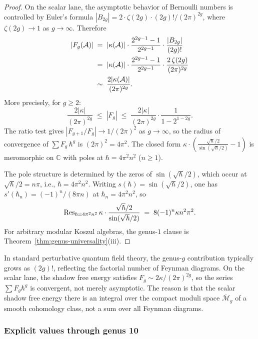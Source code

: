 \begin{proof}
On the scalar lane, the asymptotic behavior of
Bernoulli numbers is controlled by Euler's formula
$|B_{2g}| = 2 \cdot \zeta(2g) \cdot (2g)! / (2\pi)^{2g}$, where
$\zeta(2g) \to 1$ as $g \to \infty$. Therefore
\begin{align}
|F_g(\mathcal{A})| &\;=\; |\kappa(\mathcal{A})| \cdot \frac{2^{2g-1}-1}{2^{2g-1}} \cdot \frac{|B_{2g}|}{(2g)!} \notag \\
&\;=\; |\kappa(\mathcal{A})| \cdot \frac{2^{2g-1}-1}{2^{2g-1}} \cdot \frac{2\,\zeta(2g)}{(2\pi)^{2g}} \notag \\
&\;\sim\; \frac{2|\kappa(\mathcal{A})|}{(2\pi)^{2g}}. \label{eq:thqg-I-Fg-asymptotics}
\end{align}
More precisely, for $g \geq 2$:
\[
\frac{2|\kappa|}{(2\pi)^{2g}} \;\leq\; |F_g| \;\leq\; \frac{2|\kappa|}{(2\pi)^{2g}} \cdot \frac{1}{1 - 2^{1-2g}}.
\]
The ratio test gives $|F_{g+1}/F_g| \to 1/(2\pi)^2$ as $g \to \infty$, so the radius of convergence of $\sum F_g\,\hbar^g$ is $(2\pi)^2 = 4\pi^2$. The closed form $\kappa \cdot (\frac{\sqrt{\hbar}/2}{\sin(\sqrt{\hbar}/2)} - 1)$ is meromorphic on $\mathbb{C}$ with poles at $\hbar = 4\pi^2 n^2$ ($n \geq 1$).

The pole structure is determined by the zeros of $\sin(\sqrt{\hbar}/2)$,
which occur at $\sqrt{\hbar}/2 = n\pi$, i.e.,
$\hbar = 4\pi^2 n^2$. Writing $s(\hbar)=\sin(\sqrt{\hbar}/2)$, one
has $s'(\hbar_n)=(-1)^n/(8\pi n)$ at $\hbar_n = 4\pi^2 n^2$, so
\[
\operatorname{Res}_{\hbar = 4\pi^2 n^2}
\kappa \cdot \frac{\sqrt{\hbar}/2}{\sin(\sqrt{\hbar}/2)}
\;=\; 8(-1)^n \kappa n^2\pi^2.
\]
For arbitrary modular Koszul algebras, the genus-$1$ clause is
Theorem~\ref{thm:genus-universality}\textup{(iii)}.
\end{proof}

\begin{remark}
\label{rem:thqg-I-factorial-convergent}
In standard perturbative quantum field theory, the genus-$g$
contribution typically grows as $(2g)!$, reflecting the factorial
number of Feynman diagrams. On the scalar lane, the
shadow free energy satisfies $F_g \sim 2\kappa/(2\pi)^{2g}$, so the
series $\sum F_g \hbar^g$ is convergent, not merely asymptotic. The
reason is that the scalar shadow free energy there is an integral over
the compact moduli space $\overline{\mathcal{M}}_g$ of a smooth
cohomology class, not a sum over all Feynman diagrams.
\end{remark}

\subsubsection{Explicit values through genus 10}

